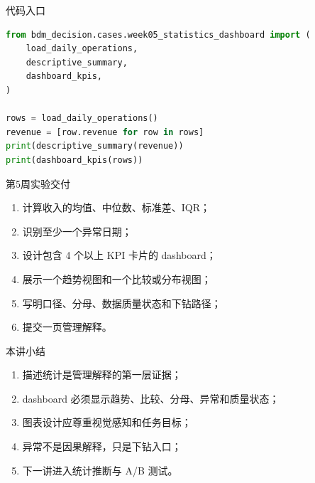 \documentclass[UTF8,fontset=fandol,aspectratio=169,11pt]{ctexbeamer}
\begin{document}
\begin{frame}[fragile]{代码入口}
\begin{lstlisting}[language=Python]
from bdm_decision.cases.week05_statistics_dashboard import (
    load_daily_operations,
    descriptive_summary,
    dashboard_kpis,
)

rows = load_daily_operations()
revenue = [row.revenue for row in rows]
print(descriptive_summary(revenue))
print(dashboard_kpis(rows))
\end{lstlisting}
\end{frame}

\begin{frame}{第5周实验交付}
\begin{enumerate}
  \item 计算收入的均值、中位数、标准差、IQR；
  \item 识别至少一个异常日期；
  \item 设计包含 4 个以上 KPI 卡片的 dashboard；
  \item 展示一个趋势视图和一个比较或分布视图；
  \item 写明口径、分母、数据质量状态和下钻路径；
  \item 提交一页管理解释。
\end{enumerate}
\end{frame}

\begin{frame}{本讲小结}
\begin{enumerate}
  \item 描述统计是管理解释的第一层证据；
  \item dashboard 必须显示趋势、比较、分母、异常和质量状态；
  \item 图表设计应尊重视觉感知和任务目标；
  \item 异常不是因果解释，只是下钻入口；
  \item 下一讲进入统计推断与 A/B 测试。
\end{enumerate}
\end{frame}
\end{document}
